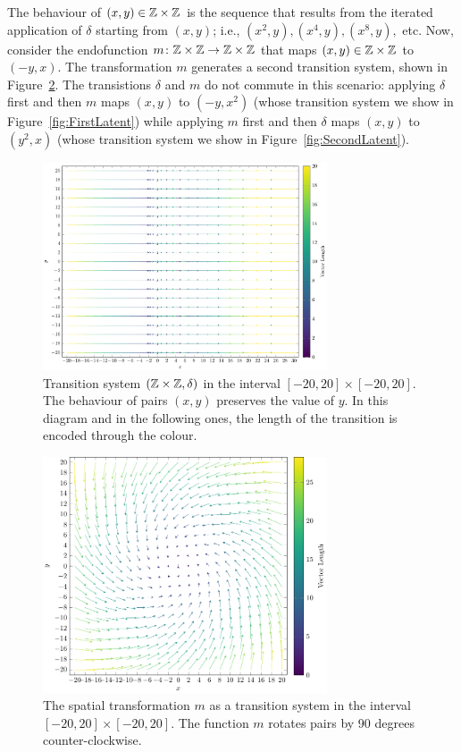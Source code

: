 The behaviour of $(x,y)\in \mathbb{Z}\times\mathbb{Z}$ is the sequence that results from the iterated application of $\delta$ starting from $(x,y)$; i.e., $(x^2,y),(x^4,y),(x^8,y),$ etc. Now, consider the endofunction $m\colon \mathbb{Z}\times\mathbb{Z}\rightarrow \mathbb{Z}\times\mathbb{Z}$ that maps $(x,y)\in \mathbb{Z}\times\mathbb{Z}$ to $(-y,x)$. The transformation $m$ generates a second transition system, shown in Figure~\ref{fig:SpatialDeformation}. The transistions $\delta$ and $m$ do not commute in this scenario: applying $\delta$ first and then $m$ maps $(x,y)$ %
to $(-y,x^2)$ (whose transition system we show in Figure~\ref{fig:FirstLatent}) while applying $m$ first and then $\delta$ maps $(x,y)$ to $(y^2,x)$ (whose transition system we show in Figure~\ref{fig:SecondLatent}). %
\begin{figure}[!t]
  \centering
  \includegraphics[width=0.75\textwidth]{Figures/VectorSpace1.pdf} 
  \caption{Transition system $(\mathbb{Z}\times\mathbb{Z}, \delta)$ in the interval $[-20,20]\times[-20,20]$. The behaviour of pairs $(x,y)$ preserves the value of $y$. In this diagram and in the following ones, the length of the transition is encoded through the colour.} 
  \label{fig:IntroVectorSpace}
\end{figure} 
\begin{figure}[!t]
  \centering
  \includegraphics[width=0.75\textwidth]{Figures/VectorSpace2.pdf} 
  \caption{The spatial transformation $m$ as a transition system in the interval $[-20,20]\times[-20,20]$. The function $m$ rotates pairs by 90 degrees counter-clockwise.} 
  \label{fig:SpatialDeformation} 
\end{figure} 

